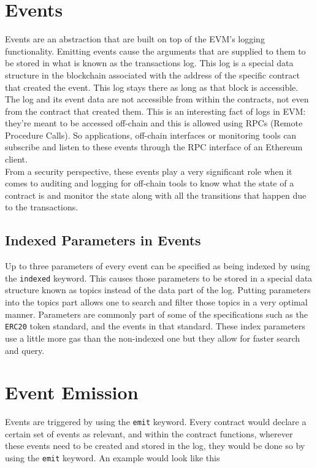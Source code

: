\section{Events}

Events are an abstraction that are built on top of the EVM's logging functionality.
Emitting events cause the arguments that are supplied to them to be stored in what is known as the transactions log. 
This log is a special data structure in the blockchain associated with the address of the specific contract that created the event.
This log stays there as long as that block is accessible.\\

The log and its event data are not accessible from within the contracts, not even from the contract that created them. 
This is an interesting fact of logs in EVM: they're meant to be accessed off-chain and this is allowed using RPCs (Remote Procedure Calls).
So applications, off-chain interfaces or monitoring tools can subscribe and listen to these events through the RPC interface of an Ethereum client.\\

From a security perspective, these events play a very significant role when it comes to auditing and logging for off-chain tools to know what the state of a contract is and monitor the state along with all the transitions that happen due to the transactions.

\subsection*{Indexed Parameters in Events}

Up to three parameters of every event can be specified as being indexed by using the \texttt{indexed} keyword.
This causes those parameters to be stored in a special data structure known as topics instead of the data part of the log.
Putting parameters into the topics part allows one to search and filter those topics in a very optimal manner.
Parameters are commonly part of some of the specifications such as the \texttt{ERC20} token standard, and the events in that standard.
These index parameters use a little more gas than the non-indexed one but they allow for faster search and query.

\section*{Event Emission}

Events are triggered by using the \texttt{emit} keyword.
Every contract would declare a certain set of events as relevant, and within the contract functions, wherever these events need to be created and stored in the log, they would be done so by using the \texttt{emit} keyword.
An example would look like this

